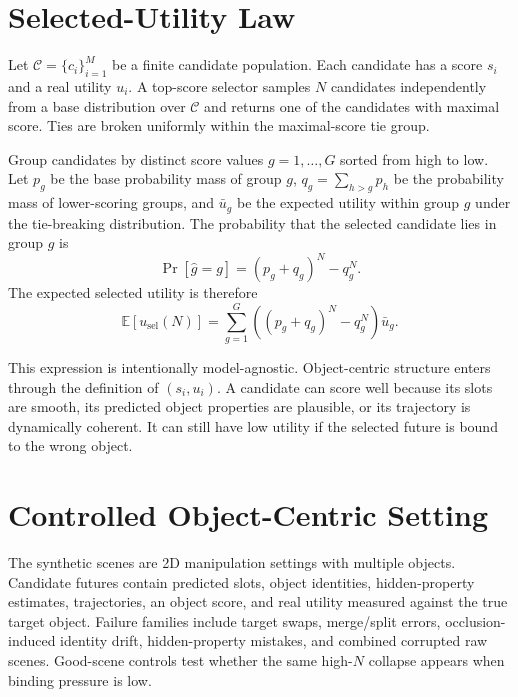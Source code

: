 \documentclass[10pt]{article}
\begin{document}
\section{Selected-Utility Law}

Let $\mathcal{C}=\{c_i\}_{i=1}^{M}$ be a finite candidate population. Each candidate has a score $s_i$ and a real utility $u_i$. A top-score selector samples $N$ candidates independently from a base distribution over $\mathcal{C}$ and returns one of the candidates with maximal score. Ties are broken uniformly within the maximal-score tie group.

Group candidates by distinct score values $g=1,\ldots,G$ sorted from high to low. Let $p_g$ be the base probability mass of group $g$, $q_g=\sum_{h>g} p_h$ be the probability mass of lower-scoring groups, and $\bar{u}_g$ be the expected utility within group $g$ under the tie-breaking distribution. The probability that the selected candidate lies in group $g$ is
\begin{equation}
  \Pr[\hat{g}=g] = (p_g + q_g)^N - q_g^N.
\end{equation}
The expected selected utility is therefore
\begin{equation}
  \mathbb{E}[u_{\mathrm{sel}}(N)] =
  \sum_{g=1}^{G} \left((p_g+q_g)^N - q_g^N\right)\bar{u}_g.
\end{equation}

This expression is intentionally model-agnostic. Object-centric structure enters through the definition of $(s_i,u_i)$. A candidate can score well because its slots are smooth, its predicted object properties are plausible, or its trajectory is dynamically coherent. It can still have low utility if the selected future is bound to the wrong object.

\section{Controlled Object-Centric Setting}

The synthetic scenes are 2D manipulation settings with multiple objects. Candidate futures contain predicted slots, object identities, hidden-property estimates, trajectories, an object score, and real utility measured against the true target object. Failure families include target swaps, merge/split errors, occlusion-induced identity drift, hidden-property mistakes, and combined corrupted raw scenes. Good-scene controls test whether the same high-$N$ collapse appears when binding pressure is low.
\end{document}
